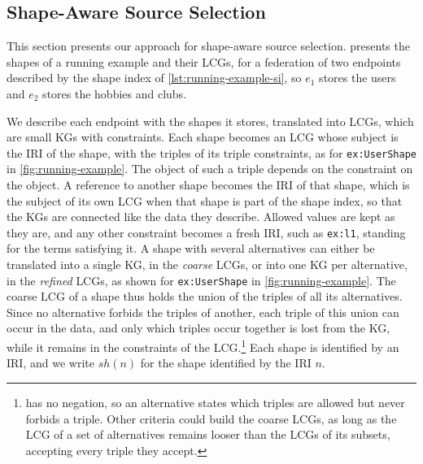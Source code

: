 \subsection{Shape-Aware Source Selection}\label{sec:sass}

This section presents our approach for shape-aware source selection.
 presents the shapes of a running example and their \acp{LCG},
for a federation of two endpoints described by the shape index of \cref{lst:running-example-si},
so $e_1$ stores the users and $e_2$ stores the hobbies and clubs.


We describe each endpoint with the shapes it stores,
translated into \acp{LCG}, which are small \acp{KG} with constraints.
Each shape becomes an \ac{LCG} whose subject is the \ac{IRI} of the shape,
with the triples of its triple constraints, as for \texttt{ex:UserShape} in \cref{fig:running-example}.
The object of such a triple depends on the constraint on the object.
A reference to another shape becomes the \ac{IRI} of that shape,
which is the subject of its own \ac{LCG} when that shape is part of the shape index, so that the \acp{KG} are connected like the data they describe.
Allowed values are kept as they are,
and any other constraint becomes a fresh \ac{IRI}, such as \texttt{ex:l1}, standing for the terms satisfying it.
A shape with several alternatives can either be translated into a single \ac{KG}, in the \emph{coarse} \acsp{LCG},
or into one \ac{KG} per alternative, in the \emph{refined} \acsp{LCG},
as shown for \texttt{ex:UserShape} in \cref{fig:running-example}.
The coarse \ac{LCG} of a shape thus holds the union of the triples of all its alternatives.
Since no alternative forbids the triples of another, each triple of this union can occur in the data,
and only which triples occur together is lost from the \ac{KG}, while it remains in the constraints of the \ac{LCG}.\footnote{ has no negation, so an alternative states which triples are allowed but never forbids a triple. Other criteria could build the coarse \acp{LCG}, as long as the \ac{LCG} of a set of alternatives remains looser than the \acp{LCG} of its subsets, accepting every triple they accept.}
Each shape is identified by an \ac{IRI}, and we write $\mathit{sh}(n)$ for the shape identified by the \ac{IRI} $n$.

